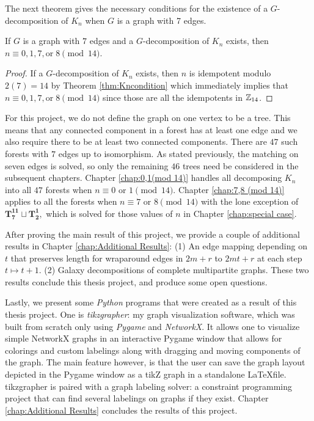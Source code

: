The next theorem gives the necessary conditions for the existence of a $G$-decomposition of $K_n$ when $G$ is a graph with 7 edges.

\begin{thm}\label{thm:forestcondition}

  If $G$ is a graph with $7$ edges and a $G$-decomposition of $K_n$ exists, then $n \equiv 0,1,7, \textrm{or} \; 8 \pmod{14}$.

\end{thm}
\begin{proof}
    If a $G$-decomposition of $K_{n}$ exists, then $n$ is idempotent modulo $2(7)=14$ by Theorem \ref{thm:Kncondition} which immediately implies that $n \equiv 0,1,7, \textrm{or} \; 8 \pmod{14}$ since those are all the idempotents in $\mathbb{Z}_{14}$.
\end{proof}

For this project, we do not define the graph on one vertex to be a tree. This means that any connected component in a forest has at least one edge and we also require there to be at least two connected components. There are $47$ such forests with $7$ edges up to isomorphism.  As stated previously, the matching on seven edges is solved, so only the remaining $46$ trees need be considered in the subsequent chapters. Chapter \ref{chap:0,1(mod 14)} handles all decomposing $K_{n}$ into all $47$ forests when $n \equiv 0 \textrm{ or } 1 \pmod{14}$. Chapter \ref{chap:7,8 (mod 14)} applies to all the forests when $n \equiv 7 \textrm{ or } 8 \pmod{14}$ with the lone exception of $\mathbf{T_{7}^{11}}\sqcup\mathbf{T_{2}^{1}},$ which is solved for those values of $n$ in Chapter \ref{chap:special case}.

After proving the main result of this project, we provide a couple of additional results in Chapter \ref{chap:Additional Results}: (1) An edge mapping depending on $t$ that preserves length for wraparound edges in  $2m+r$ to $2mt+r$ at each step $t\mapsto t+1$. (2) Galaxy decompositions of complete multipartite graphs. These two results conclude this thesis project, and produce some open questions.

Lastly, we present some \textit{Python} programs that were created as a result of this thesis project. One is \textit{tikzgrapher}: my graph visualization software, which was built from scratch only using \textit{Pygame} and \textit{NetworkX}. It allows one to visualize simple NetworkX graphs in an interactive Pygame window that allows for colorings and custom labelings along with dragging and moving components of the graph. The main feature however, is that the user can save the graph layout depicted in the Pygame window as a tikZ graph in a standalone \LaTeX  file. tikzgrapher is paired with a graph labeling solver: a constraint programming project that can find several labelings on graphs if they exist. Chapter \ref{chap:Additional Results} concludes the results of this project.




